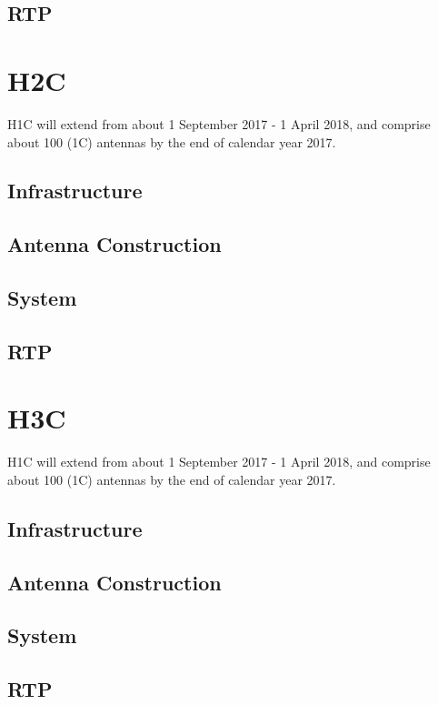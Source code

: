 \documentclass{article}
\begin{document}
\subsection{RTP}


\section{H2C}
H1C will extend from about 1 September 2017 - 1 April 2018, and comprise about 100 (1C) antennas by the end of calendar year 2017.

\subsection{Infrastructure}

\subsection{Antenna Construction}

\subsection{System}

\subsection{RTP}

\section{H3C}
H1C will extend from about 1 September 2017 - 1 April 2018, and comprise about 100 (1C) antennas by the end of calendar year 2017.

\subsection{Infrastructure}

\subsection{Antenna Construction}

\subsection{System}

\subsection{RTP}
\end{document}
